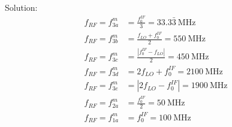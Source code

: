 \begin{homeworkProblem}
\begin{enumerate}[a)]
\begin{callout}{Solution:}
            \begin{align*}
                f_{R F}=f_{3 a}^m&=\frac{f_0^{I F}}{3} = 33.3\bar{3}\mathrm{~MHz} \\
                f_{R F}=f_{3 b}^m&=\frac{f_{L O}+f_0^{I F}}{2} = 550\mathrm{~MHz} \\
                f_{R F}=f_{3 c}^m&=\frac{\left|f_0^{I F}-f_{L O}\right|}{2} = 450\mathrm{~MHz} \\
                f_{R F}=f_{3 d}^m&=2 f_{L O}+f_0^{I F} = 2100 \mathrm{~MHz} \\
                f_{R F}=f_{3 e}^m&=\left|2 f_{L O}-f_0^{I F}\right| = 1900\mathrm{~MHz} \\
                f_{R F}=f_{2 a}^m&=\frac{f_0^{I F}}{2} = 50\mathrm{~MHz} \\
                f_{R F}=f_{1 a}^m&=f_0^{I F} = 100 \mathrm{~MHz}
            \end{align*}

            \end{callout}
    \end{enumerate}
\end{homeworkProblem}

